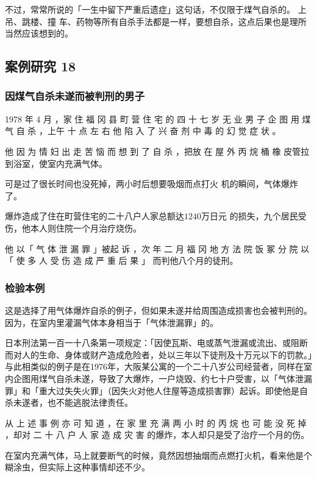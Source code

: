 \documentclass[UTF8]{ctexart}
\begin{document}
不过，常常所说的「一生中留下严重后遗症」这句话，不仅限于煤气自杀的。
上吊、跳楼、撞 车、药物等所有自杀手法都是一样，要想自杀，这点后果也是理所当然应该想到的。


\subsection{案例研究 18}

\subsubsection*{因煤气自杀未遂而被判刑的男子}

1978 年 4 月 ，家 住 福 冈 县 町 营 住 宅 的 四 十 七 岁 无 业 男 子 企 图 用 煤 气 自 杀 ，上午 十 点 左 右 他 陷 入 了 兴 奋 剂 中 毒 的 幻 觉 症 状 。

他 因 为 情 妇 出 走 苦 恼 而 想 到 了 自 杀 ，把放 在 屋 外 丙 烷 桶 橡 皮管拉到浴室，使室内充满气体。

可是过了很长时间也没死掉，两小时后想要吸烟而点打火 机的瞬间，气体爆炸了。

爆炸造成了住在町营住宅的二十八户人家总额达$1240$万日元 的损失，九个居民受伤，他本人则住院一个月治疗烧伤。 

他 以「 气 体 泄 漏 罪 」被起 诉 ，次 年 二 月 福 冈 地 方 法 院 饭 冢 分 院 以「 使 多 人 受 伤 造 成 严 重 后 果 」 而判他八个月的徒刑。

\subsubsection*{检验本例}

这是选择了用气体爆炸自杀的例子，但如果未遂并给周围造成损害也会被判刑的。
因为，在室内里灌漏气体本身相当于「气体泄漏罪」的。

日本刑法第一百一十八条第一项规定：「因使瓦斯、电或蒸气泄漏或流出、或阻断而对人的生命、身体或财产造成危险者，处以三年以下徒刑及十万元以下的罚款。」与此相类似的例子是在1976年，大阪某公寓的一个二十八岁公司经营者，同样在室内企图用煤气自杀未遂，导致了大爆炸，一户烧毁、约七十户受害，以「气体泄漏罪」和「重大过失失火罪」（因失火对他人住屋等造成损害罪）起诉。即使他是自杀未遂者，也不能逃脱法律责任。

从 上 述 事 例 亦 可 知 道 ，在 家 里 充 满 两 小 时 的 丙 烷 也 可 能 没 死 掉 ，却对 二 十 八 户 人 家 造 成 灾 害 的爆炸，本人却只是受了治疗一个月的伤。

在室内充满气体，马上就要断气的时候，竟然因想抽烟而点燃打火机，看来他是个糊涂虫，但实际上这种事情却还不少。
\end{document}
